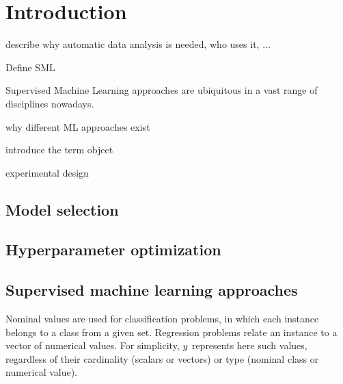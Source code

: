 \chapter{Introduction}

describe why automatic data analysis is needed, who uses it, ...

Define SML

Supervised Machine Learning approaches are ubiquitous in a vast range of disciplines nowadays.

why different ML approaches exist

introduce the term object

experimental design

\section{Model selection}
\lipsum[31]

\section{Hyperparameter optimization}
\lipsum[33]

\section{Supervised machine learning approaches}

		Nominal values are used for classification problems, in which each instance belongs to a
		class from a given set. Regression problems relate an instance to a vector of numerical
		values. For simplicity, $y$ represents here such values, regardless of their
		cardinality (scalars or vectors) or type (nominal class or numerical value).
		
